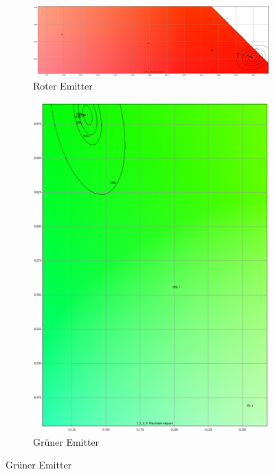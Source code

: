 \documentclass[11pt]{scrartcl}
\begin{document}
\begin{figure}[H]
    \centering
    \begin{subfigure}[b]{.49\textwidth}
        \includegraphics[width=\textwidth]{images/macAdam/lightCanRed.png}
        \caption{Roter Emitter}
    \end{subfigure}
    \hfill 
    \begin{subfigure}[b]{.49\textwidth}
        \includegraphics[width=\textwidth]{images/macAdam/lightCanGreen.png}
        \caption{Grüner Emitter}
    \end{subfigure}

\end{figure}
\end{document}
